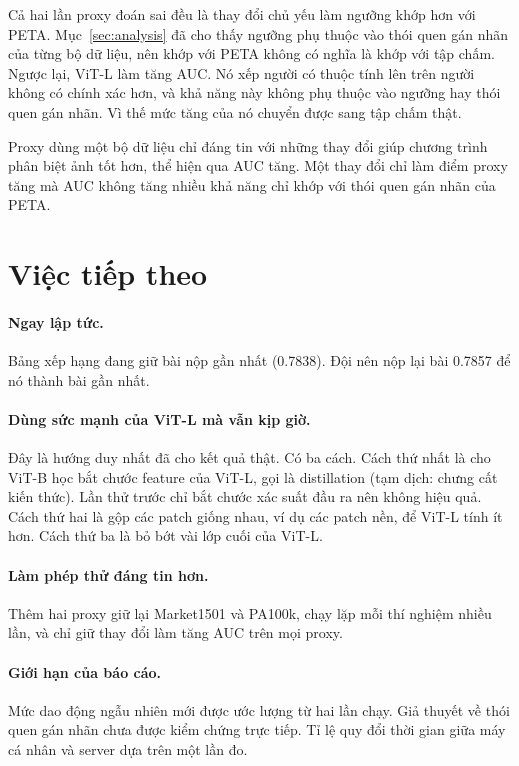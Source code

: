 \documentclass[11pt,a4paper]{article}
\begin{document}
Cả hai lần proxy đoán sai đều là thay đổi chủ yếu làm ngưỡng khớp hơn với PETA. Mục~\ref{sec:analysis} đã cho thấy ngưỡng phụ thuộc vào thói quen gán nhãn của từng bộ dữ liệu, nên khớp với PETA không có nghĩa là khớp với tập chấm. Ngược lại, ViT-L làm tăng AUC. Nó xếp người có thuộc tính lên trên người không có chính xác hơn, và khả năng này không phụ thuộc vào ngưỡng hay thói quen gán nhãn. Vì thế mức tăng của nó chuyển được sang tập chấm thật.

\begin{ghichu}
Proxy dùng một bộ dữ liệu chỉ đáng tin với những thay đổi giúp chương trình phân biệt ảnh tốt hơn, thể hiện qua AUC tăng. Một thay đổi chỉ làm điểm proxy tăng mà AUC không tăng nhiều khả năng chỉ khớp với thói quen gán nhãn của PETA.
\end{ghichu}

\section{Việc tiếp theo}

\paragraph{Ngay lập tức.} Bảng xếp hạng đang giữ bài nộp gần nhất (0.7838). Đội nên nộp lại bài 0.7857 để nó thành bài gần nhất.

\paragraph{Dùng sức mạnh của ViT-L mà vẫn kịp giờ.} Đây là hướng duy nhất đã cho kết quả thật. Có ba cách. Cách thứ nhất là cho ViT-B học bắt chước feature của ViT-L, gọi là distillation (tạm dịch: chưng cất kiến thức). Lần thử trước chỉ bắt chước xác suất đầu ra nên không hiệu quả. Cách thứ hai là gộp các patch giống nhau, ví dụ các patch nền, để ViT-L tính ít hơn. Cách thứ ba là bỏ bớt vài lớp cuối của ViT-L.

\paragraph{Làm phép thử đáng tin hơn.} Thêm hai proxy giữ lại Market1501 và PA100k, chạy lặp mỗi thí nghiệm nhiều lần, và chỉ giữ thay đổi làm tăng AUC trên mọi proxy.

\paragraph{Giới hạn của báo cáo.} Mức dao động ngẫu nhiên mới được ước lượng từ hai lần chạy. Giả thuyết về thói quen gán nhãn chưa được kiểm chứng trực tiếp. Tỉ lệ quy đổi thời gian giữa máy cá nhân và server dựa trên một lần đo.
\end{document}
